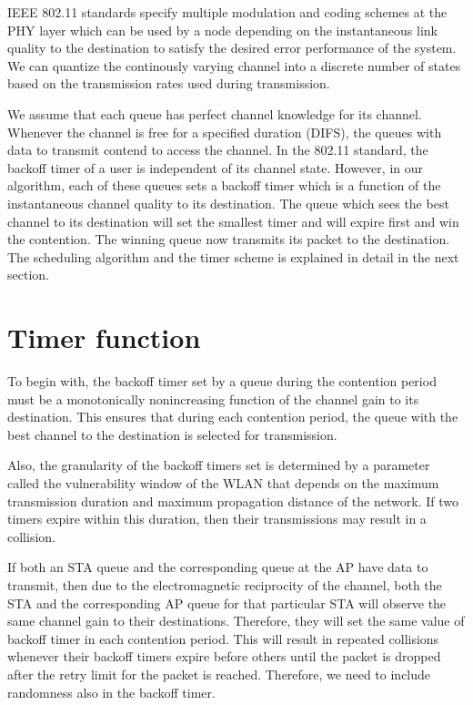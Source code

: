 \documentclass[10pt,conference]{IEEEtran}
\begin{document}
 IEEE 802.11 standards specify multiple modulation and coding schemes at the PHY layer which can be used by a node depending on the instantaneous link quality to the destination to satisfy the desired error performance of the system.  
We can quantize the continously varying channel into a discrete number of states based on the transmission rates used during transmission.

We assume that each queue has perfect channel knowledge for its channel.
Whenever the channel is free for a specified duration (DIFS), the queues with data to transmit contend to access the channel.
In the 802.11 standard, the backoff timer of a user is independent of its channel state.
However, in our algorithm, each of these queues sets a backoff timer which is a function of the instantaneous channel quality to its destination. 
The queue which sees the best channel to its destination will set the smallest timer and will expire first and win the contention. The winning queue now transmits its packet to the destination.
The scheduling algorithm and the timer scheme is explained in detail in the next section.

\section{Timer function}
\label{sec:timerfunc}
 To begin with, the backoff timer set by a queue during the contention period must be a monotonically nonincreasing function of the channel gain to its destination. This ensures that during each contention period, the queue with the best channel to the destination is selected for transmission.
 
 Also, the granularity of the backoff timers set is determined by a parameter called the vulnerability window  of the WLAN that depends on the maximum transmission duration and maximum propagation distance of the network\cite{virag10}.
 If two timers expire within this duration, then their transmissions may result in a collision.

 If both an STA queue and the corresponding queue at the AP  have data to transmit, then due to the electromagnetic reciprocity of the channel, both the STA and the corresponding AP queue for that particular STA will observe the same channel gain to their destinations.
 Therefore, they will set the same value of backoff timer in each contention period.
 This will result in repeated collisions whenever their backoff timers expire before others until the packet is dropped after the retry limit for the packet is reached.
Therefore, we need to include randomness also in the backoff timer.
\end{document}
